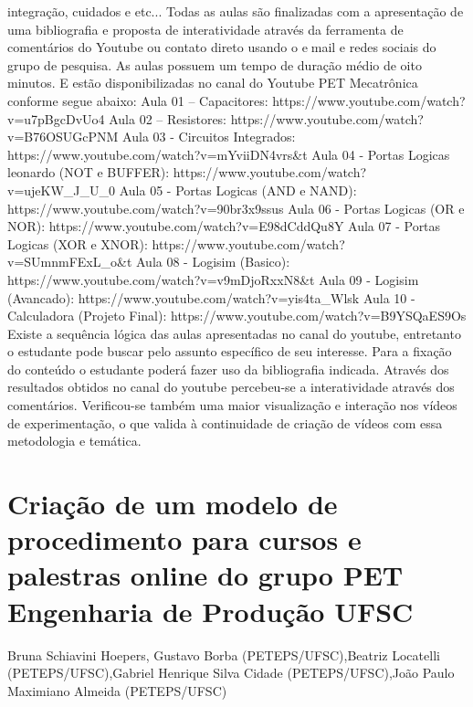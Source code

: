 integração, cuidados e etc... 
Todas as aulas são finalizadas com a apresentação de uma bibliografia e proposta de 
interatividade através da ferramenta de comentários do Youtube ou contato direto usando o email e redes sociais do grupo de pesquisa.
As aulas possuem um tempo de duração médio de oito minutos. E estão disponibilizadas 
no canal do Youtube PET Mecatrônica conforme segue abaixo:
Aula 01 – Capacitores: 
https://www.youtube.com/watch?v=u7pBgcDvUo4
Aula 02 – Resistores:
https://www.youtube.com/watch?v=B76OSUGcPNM
Aula 03 - Circuitos Integrados:
https://www.youtube.com/watch?v=mYviiDN4vrs&t
Aula 04 - Portas Logicas leonardo (NOT e BUFFER): 
https://www.youtube.com/watch?v=ujeKW_J_U_0
Aula 05 - Portas Logicas (AND e NAND): 
https://www.youtube.com/watch?v=90br3x9ssus
Aula 06 - Portas Logicas (OR e NOR): 
https://www.youtube.com/watch?v=E98dCddQu8Y
Aula 07 - Portas Logicas (XOR e XNOR): 
https://www.youtube.com/watch?v=SUmnmFExL_o&t
Aula 08 - Logisim (Basico):
https://www.youtube.com/watch?v=v9mDjoRxxN8&t
Aula 09 - Logisim (Avancado):
https://www.youtube.com/watch?v=yis4ta_Wlsk
Aula 10 - Calculadora (Projeto Final): 
https://www.youtube.com/watch?v=B9YSQaES9Os
Existe a sequência lógica das aulas apresentadas no canal do youtube, entretanto o 
estudante pode buscar pelo assunto específico de seu interesse. Para a fixação do conteúdo o 
estudante poderá fazer uso da bibliografia indicada.
Através dos resultados obtidos no canal do youtube percebeu-se a interatividade através 
dos comentários. Verificou-se também uma maior visualização e interação nos vídeos de 
experimentação, o que valida à continuidade de criação de vídeos com essa metodologia e 
temática.



\section{Criação de um modelo de procedimento para cursos e palestras online do grupo PET Engenharia de Produção UFSC}

Bruna Schiavini Hoepers, Gustavo Borba (PETEPS/UFSC),Beatriz Locatelli (PETEPS/UFSC),Gabriel Henrique Silva Cidade (PETEPS/UFSC),João Paulo Maximiano Almeida (PETEPS/UFSC)

